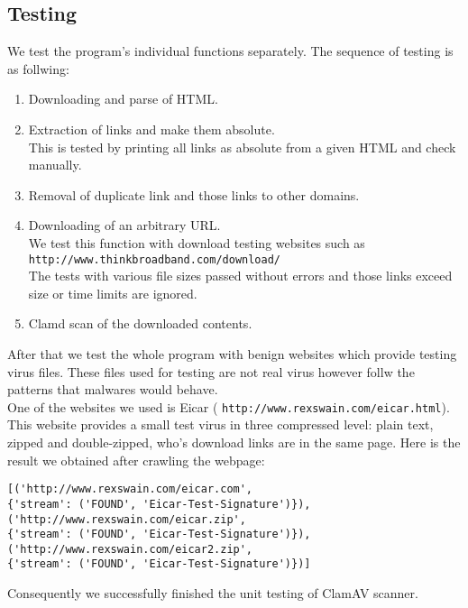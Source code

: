 \subsection{Testing}
We test the program's individual functions separately. The sequence of 
testing is as follwing:
\begin{enumerate}
\item Downloading and parse of HTML. 
\item Extraction of links and make them absolute.\\
This is tested by printing all links as absolute from a given HTML and check 
manually. 
\item Removal of duplicate link and those links to other domains. 
\item Downloading of an arbitrary URL. \\
We test this function with download testing websites such as \\
\verb`http://www.thinkbroadband.com/download/`\\
The tests with various file 
sizes passed without errors and those links exceed size or time limits are 
ignored. 
\item Clamd scan of the downloaded contents. 
\end{enumerate}
After that we test the whole program with benign websites which provide 
testing virus files. 
These files used for testing are not real virus however follw the patterns 
that malwares would behave. \\
One of the websites we used is Eicar (
\verb`http://www.rexswain.com/eicar.html`). This website provides a small test 
virus in three compressed level: plain text, zipped and double-zipped, who's 
download links are in the same page. Here is the result we obtained after 
crawling the webpage:
\begin{verbatim}
[('http://www.rexswain.com/eicar.com', 
{'stream': ('FOUND', 'Eicar-Test-Signature')}), 
('http://www.rexswain.com/eicar.zip', 
{'stream': ('FOUND', 'Eicar-Test-Signature')}), 
('http://www.rexswain.com/eicar2.zip', 
{'stream': ('FOUND', 'Eicar-Test-Signature')})]
\end{verbatim}
Consequently we successfully finished the unit testing of ClamAV scanner. 
